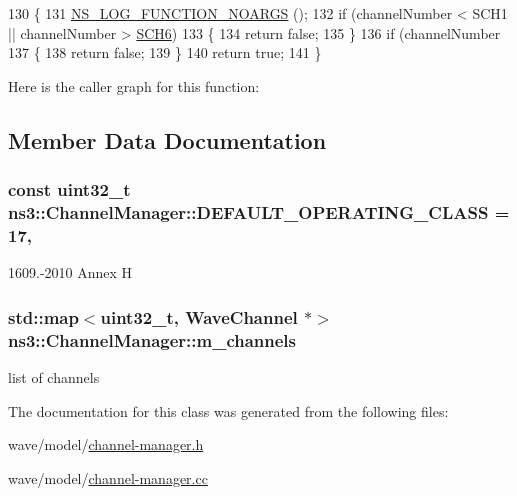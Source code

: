 \begin{DoxyCode}
130 \{
131   \hyperlink{log-macros-disabled_8h_a8f7e4afc291c9d29a65c18ac1f79197b}{NS\_LOG\_FUNCTION\_NOARGS} ();
132   \textcolor{keywordflow}{if} (channelNumber < SCH1 || channelNumber > \hyperlink{channel-manager_8h_aaa6c2f65c1bf2134a15028491ac3e5ca}{SCH6})
133     \{
134       \textcolor{keywordflow}{return} \textcolor{keyword}{false};
135     \}
136   \textcolor{keywordflow}{if} (channelNumber %
137     \{
138       \textcolor{keywordflow}{return} \textcolor{keyword}{false};
139     \}
140   \textcolor{keywordflow}{return} \textcolor{keyword}{true};
141 \}
\end{DoxyCode}


Here is the caller graph for this function\+:




\subsection{Member Data Documentation}
\subsubsection[{\texorpdfstring{D\+E\+F\+A\+U\+L\+T\+\_\+\+O\+P\+E\+R\+A\+T\+I\+N\+G\+\_\+\+C\+L\+A\+SS}{DEFAULT_OPERATING_CLASS}}]{\setlength{\rightskip}{0pt plus 5cm}const uint32\+\_\+t ns3\+::\+Channel\+Manager\+::\+D\+E\+F\+A\+U\+L\+T\+\_\+\+O\+P\+E\+R\+A\+T\+I\+N\+G\+\_\+\+C\+L\+A\+SS = 17\hspace{0.3cm}{\ttfamily [static]}, {\ttfamily [private]}}\hypertarget{classns3_1_1ChannelManager_a7f0258772a1d9dcb349c3da169bea428}{}\label{classns3_1_1ChannelManager_a7f0258772a1d9dcb349c3da169bea428}


1609.-\/2010 Annex H 

\subsubsection[{\texorpdfstring{m\+\_\+channels}{m_channels}}]{\setlength{\rightskip}{0pt plus 5cm}std\+::map$<$uint32\+\_\+t, {\bf Wave\+Channel} $\ast$$>$ ns3\+::\+Channel\+Manager\+::m\+\_\+channels\hspace{0.3cm}{\ttfamily [private]}}\hypertarget{classns3_1_1ChannelManager_ab36f83192053de6c16e1b605f12f5f67}{}\label{classns3_1_1ChannelManager_ab36f83192053de6c16e1b605f12f5f67}


list of channels 



The documentation for this class was generated from the following files\+:\begin{DoxyCompactItemize}
\item 
wave/model/\hyperlink{channel-manager_8h}{channel-\/manager.\+h}\item 
wave/model/\hyperlink{channel-manager_8cc}{channel-\/manager.\+cc}\end{DoxyCompactItemize}
